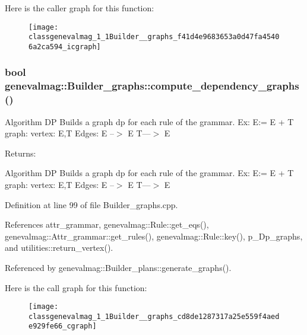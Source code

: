 Here is the caller graph for this function:\nopagebreak
\begin{figure}[H]
\begin{center}
\leavevmode
\texttt{[image: classgenevalmag\_1\_1Builder\_\_graphs\_f41d4e9683653a0d47fa45406a2ca594\_icgraph]}
\end{center}
\end{figure}
\hypertarget{classgenevalmag_1_1Builder__graphs_cd8de1287317a25e559f4aede929fe66}{
\subsubsection[{compute\_\-dependency\_\-graphs}]{\setlength{\rightskip}{0pt plus 5cm}bool genevalmag::Builder\_\-graphs::compute\_\-dependency\_\-graphs ()}}
\label{classgenevalmag_1_1Builder__graphs_cd8de1287317a25e559f4aede929fe66}


Algorithm DP Builds a graph dp for each rule of the grammar. Ex: E:= E + T graph: vertex: E,T Edges: E --$>$ E T---$>$ E \begin{Desc}
\item[Returns:]\end{Desc}
Algorithm DP Builds a graph dp for each rule of the grammar. Ex: E:= E + T graph: vertex: E,T Edges: E --$>$ E T---$>$ E 

Definition at line 99 of file Builder\_\-graphs.cpp.

References attr\_\-grammar, genevalmag::Rule::get\_\-eqs(), genevalmag::Attr\_\-grammar::get\_\-rules(), genevalmag::Rule::key(), p\_\-Dp\_\-graphs, and utilities::return\_\-vertex().

Referenced by genevalmag::Builder\_\-plans::generate\_\-graphs().

Here is the call graph for this function:\nopagebreak
\begin{figure}[H]
\begin{center}
\leavevmode
\texttt{[image: classgenevalmag\_1\_1Builder\_\_graphs\_cd8de1287317a25e559f4aede929fe66\_cgraph]}
\end{center}
\end{figure}


